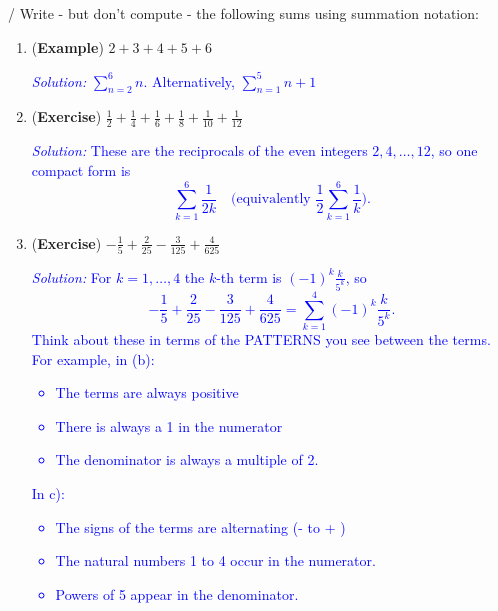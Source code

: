\documentclass[10pt]{article}
\begin{document}
{\example / \exercise} Write - but don't compute - the following sums using summation notation:
    \begin{enumerate}
    \item[(a)] ({\bf\color{blue}Example}) $2+3+4+5+6$
        \par\noindent\textcolor{blue}{\emph{Solution:} $\displaystyle\sum_{n=2}^{6} n$.
        Alternatively, $\displaystyle\sum_{n=1}^{5} n+ 1$
        
        
        }
        \vfill
    \item[(b)] ({\bf\color{blue}Exercise}) $\displaystyle\frac12+\frac14+\frac16+\frac18+\frac1{10}+\frac1{12}$
        \par\noindent\textcolor{blue}{\emph{Solution:} These are the reciprocals of the even integers $2,4,\dots,12$, so one compact form is
        \[
        \sum_{k=1}^{6}\frac{1}{2k} \quad\text{(equivalently }\frac{1}{2}\sum_{k=1}^{6}\frac{1}{k}\text{).}
        \]}
        \vfill
    \item[(c)] ({\bf\color{blue}Exercise}) $\displaystyle-\frac15+\frac2{25}-\frac3{125}+\frac4{625}$
        \par\noindent\textcolor{blue}{\emph{Solution:} For $k=1,\dots,4$ the $k$-th term is $(-1)^k\frac{k}{5^k}$, so
        \[
        -\frac15+\frac{2}{25}-\frac{3}{125}+\frac{4}{625}=\sum_{k=1}^4 (-1)^k\frac{k}{5^k}.
        \]
        Think about these in terms of the PATTERNS you see between the terms. For example, in (b):
        \begin{itemize}
            \item The terms are always positive\\
            \item There is always a 1 in the numerator\\
            \item The denominator is always a multiple of 2.
        \end{itemize}
        In c):
        \begin{itemize}
            \item The signs of the terms are alternating (-  to + )\\
            \item The natural numbers 1 to 4 occur in the numerator.\\
            \item Powers of 5 appear in the denominator.
        \end{itemize}
        }
        \vfill
    \end{enumerate}
    
\end{document}
